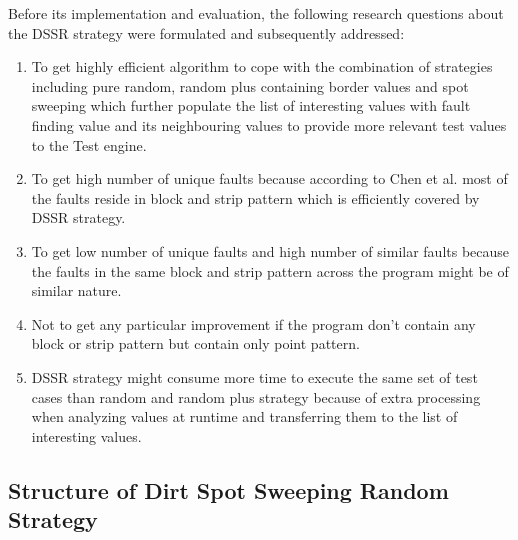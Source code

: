 Before its implementation and evaluation, the following research questions about the DSSR strategy were formulated and subsequently addressed:\\
\begin{enumerate}

\item To get highly efficient algorithm to cope with the combination of strategies including pure random, random plus containing border values and spot sweeping which further populate the list of interesting values with fault finding value and its neighbouring values to provide more relevant test values to the Test engine. \\

\item To get high number of unique faults because according to Chen et al. \cite{Chen2006} most of the faults reside in block and strip pattern which is efficiently covered by DSSR strategy. \\

\item To get  low number of unique faults and high number of similar faults because the faults in the same block and strip pattern across the program might be of similar nature.\\

\item  Not to get any particular improvement if the program don't contain any block or strip pattern but contain only point pattern.\\

\item  DSSR strategy might consume more time to execute the same set of test cases than random and random plus strategy because of extra processing when analyzing values at runtime and transferring them to the list of interesting values.\\



\end{enumerate}

\subsection{Structure of Dirt Spot Sweeping Random Strategy}

